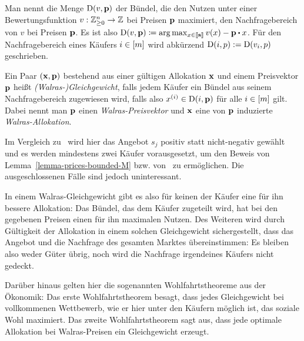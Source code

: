 \begin{definition}[Nachfragebereich]
	Man nennt die Menge $\operatorname{D}(v,\mathbf{p})$ der Bündel, die den Nutzen unter einer Bewertungsfunktion $v:\mathbb{Z}^n_{\geq 0} \rightarrow \mathbb{Z}$ bei Preisen $\mathbf{p}$ maximiert, den Nachfragebereich von $v$ bei Preisen $\mathbf{p}$.
	Es ist also $ \NB(v, \fp) \coloneqq \arg\max_{x\in\ffirst{\fs}} v(x) - \fp \bcdot x$.
	Für den Nachfragebereich eines Käufers $i\in\left[ m \right]$ wird abkürzend $\operatorname{D}(i,p):=\operatorname{D}(v_i, p)$ geschrieben.
\end{definition}

\begin{definition}
	Ein Paar $(\mathbf{x}, \mathbf{p})$ bestehend aus einer gültigen Allokation $\mathbf{x}$ und einem Preisvektor $\mathbf{p}$ heißt \emph{(Walras-)Gleichgewicht}, falls jedem Käufer ein Bündel aus seinem Nachfragebereich zugewiesen wird, falls also $x^{(i)} \in \operatorname{D}(i, \mathbf{p})$ für alle $i\in \left[ m \right]$ gilt.
	Dabei nennt man $\mathbf{p}$ einen \emph{Walras-Preisvektor} und $\mathbf{x}$ eine von $\mathbf{p}$ induzierte \emph{Walras-Allokation}.
\end{definition}

\begin{bemerkung}
	Im Vergleich zu~\cite{PaesLeme2018} wird hier das Angebot $s_j$ positiv statt nicht-negativ gewählt und es werden mindestens zwei Käufer vorausgesetzt, um den Beweis von Lemma~\ref{lemma-prices-bounded-M} bzw. von~\cite[Lemma 4]{PaesLeme2018} zu ermöglichen.
	Die ausgeschlossenen Fälle sind jedoch uninteressant.
\end{bemerkung}

In einem Walras-Gleichgewicht gibt es also für keinen der Käufer eine für ihn bessere Allokation: Das Bündel, das dem Käufer zugeteilt wird, hat bei den gegebenen Preisen einen für ihn maximalen Nutzen.
Des Weiteren wird durch Gültigkeit der Allokation in einem solchen Gleichgewicht sichergestellt, dass das Angebot und die Nachfrage des gesamten Marktes übereinstimmen: Es bleiben also weder Güter übrig, noch wird die Nachfrage irgendeines Käufers nicht gedeckt.

Darüber hinaus gelten hier die sogenannten Wohlfahrtstheoreme aus der Ökonomik:
Das erste Wohlfahrtstheorem besagt, dass jedes Gleichgewicht bei vollkommenen Wettbewerb, wie er hier unter den Käufern möglich ist, das soziale Wohl maximiert.
Das zweite Wohlfahrtstheorem sagt aus, dass jede optimale Allokation bei Walras-Preisen ein Gleichgewicht erzeugt.

